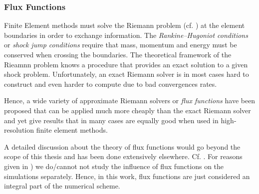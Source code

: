 \subsubsection{Flux Functions}
\label{sec:flux-functions}
Finite Element methods must solve the Riemann problem (cf. )
at the element boundaries in order to exchange information.  The
\emph{Rankine–Hugoniot conditions} or \emph{shock jump conditions} require that
mass, momentum and energy must be conserved when crossing the boundaries. The
theoretical framework of the Rieamnn problem knows a procedure that provides an
exact solution to a given shock problem. Unfortunately, an exact Riemann solver
is in most cases hard to construct and even harder to compute due to bad
convergences rates.

Hence, a wide variety of approximate Riemann solvers or \emph{flux functions}
have been proposed that can be applied much more cheaply than the exact Riemann
solver and yet give results that in many cases are equally good when used in
high-resolution finite element methods. 

A detailed discussion about the theory of flux functions would go beyond the
scope of this thesis and has been done extensively elsewhere. Cf.
\cite{winters2016affordable,derigs2017novel}. For reasons given in
) we do/cannot not study the influence of flux
functions on the simulations separately. Hence, in this work, flux functions
are just considered an integral part of the numerical scheme.
